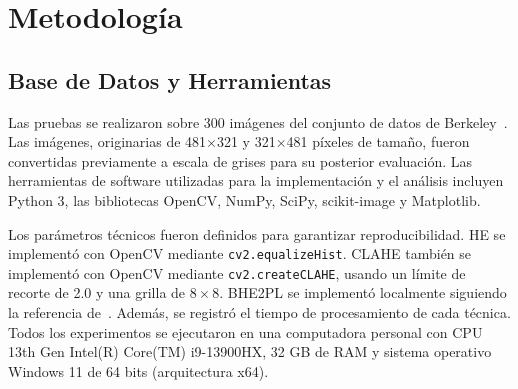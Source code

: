 \documentclass[journal,10pt,twocolumn]{IEEEtran}
\begin{document}
\section{Metodología}
\subsection{Base de Datos y Herramientas}
Las pruebas se realizaron sobre 300 imágenes del conjunto de datos de Berkeley~\cite{MartinFTM01}. Las imágenes, originarias de 481$\times$321  y 321$\times$481 píxeles de tamaño, fueron convertidas previamente a escala de grises para su posterior evaluación. Las herramientas de software utilizadas para la implementación y el análisis incluyen Python 3, las bibliotecas OpenCV, NumPy, SciPy, scikit-image y Matplotlib.

Los parámetros técnicos fueron definidos para garantizar reproducibilidad. HE se implementó con OpenCV mediante \texttt{cv2.equalizeHist}. CLAHE también se implementó con OpenCV mediante \texttt{cv2.createCLAHE}, usando un límite de recorte de 2.0 y una grilla de $8\times 8$. BHE2PL se implementó localmente siguiendo la referencia de~\cite{aquino2017bi}. Además, se registró el tiempo de procesamiento de cada técnica. Todos los experimentos se ejecutaron en una computadora personal con CPU 13th Gen Intel(R) Core(TM) i9-13900HX, 32 GB de RAM y sistema operativo Windows 11 de 64 bits (arquitectura x64).
\end{document}

